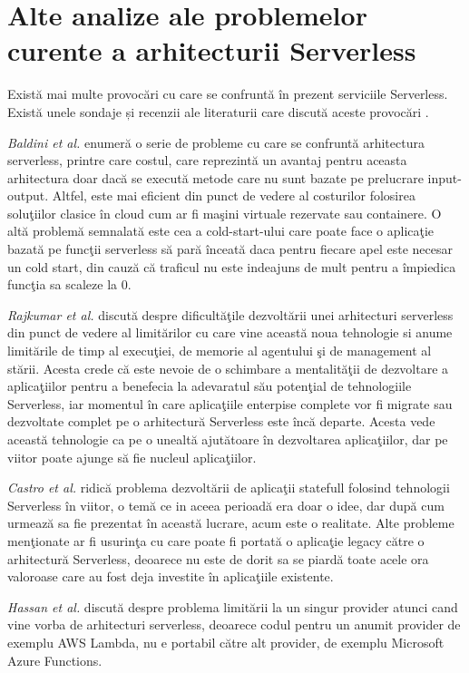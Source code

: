 \section{Alte analize ale problemelor curente a arhitecturii Serverless}
\quad Există mai multe provocări cu care se confruntă în prezent serviciile Serverless. Există unele sondaje și recenzii ale literaturii care discută aceste provocări \cite{baldini2017,rajkumar2017,paul2019,hassan2017,jonas2019}.
\par\emph{Baldini et al.} \cite{baldini2017} enumeră o serie de probleme cu care se confruntă arhitectura serverless, printre care costul, care reprezintă un avantaj pentru aceasta arhitectura doar dacă se execută metode care nu sunt bazate pe prelucrare input-output. Altfel, este mai eficient din punct de vedere al costurilor folosirea soluţiilor clasice în cloud cum ar fi maşini virtuale rezervate sau containere. O altă problemă semnalată este cea a cold-start-ului care poate face o aplicaţie bazată pe funcţii serverless să pară înceată daca pentru fiecare apel este necesar un cold start, din cauză că traficul nu este indeajuns de mult pentru a împiedica funcţia sa scaleze la 0. 
\par\emph{Rajkumar et al.} \cite{rajkumar2017} discută despre dificultăţile dezvoltării unei arhitecturi serverless din punct de vedere al limitărilor cu care vine această noua tehnologie si anume limitările de timp al execuţiei, de memorie al agentului şi de management al stării. Acesta crede că este nevoie de o schimbare a mentalităţii de dezvoltare a aplicaţiilor pentru a benefecia la adevaratul său potenţial de tehnologiile Serverless, iar momentul în care aplicaţiile enterpise complete vor fi migrate sau dezvoltate complet pe o arhitectură Serverless este încă departe. Acesta vede această tehnologie ca pe o unealtă ajutătoare în dezvoltarea aplicaţiilor, dar pe viitor poate ajunge să fie nucleul aplicaţiilor.  
\par\emph{Castro et al.} \cite{paul2019} ridică problema dezvoltării de aplicaţii statefull folosind tehnologii Serverless în viitor, o temă ce in aceea perioadă era doar o idee, dar după cum urmează sa fie prezentat în această lucrare, acum este o realitate. Alte probleme menţionate ar fi usurinţa cu care poate fi portată o aplicaţie legacy către o arhitectură Serverless, deoarece nu este de dorit sa se piardă toate acele ora valoroase care au fost deja investite în aplicaţiile existente. 
\par\emph{Hassan et al.} \cite{hassan2017} discută despre problema limitării la un singur provider atunci cand vine vorba de arhitecturi serverless, deoarece codul pentru un anumit provider de exemplu AWS Lambda, nu e portabil către alt provider, de exemplu Microsoft Azure Functions. 
